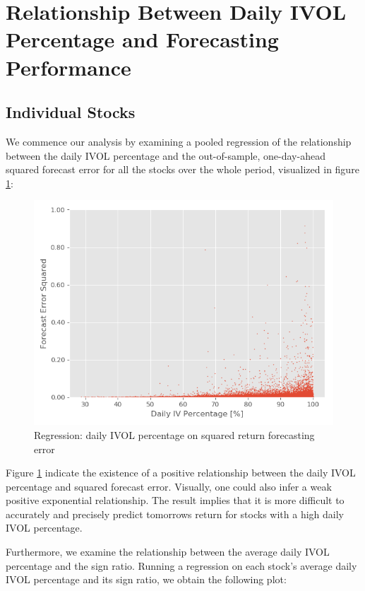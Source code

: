 \section{Relationship Between Daily IVOL Percentage and Forecasting Performance}

\subsection{Individual Stocks}

We commence our analysis by examining a pooled regression of the relationship between the daily IVOL percentage and the out-of-sample, one-day-ahead squared forecast error for all the stocks over the whole period, visualized in figure \ref{Scatter regression}: 

\begin{figure}[h]
    \centering
    \includegraphics[scale = 0.5]{Plot/ScatterRegression.png}
    \caption{Regression: daily IVOL percentage on squared return forecasting error}
    \label{Scatter regression}
\end{figure}

Figure \ref{Scatter regression} indicate the existence of a positive relationship between the daily IVOL percentage and squared forecast error. Visually, one could also infer a weak positive exponential relationship. The result implies that it is more difficult to accurately and precisely predict tomorrows return for stocks with a high daily IVOL percentage.

Furthermore, we examine the relationship between the average daily IVOL percentage and the sign ratio. Running a regression on each stock's average daily IVOL percentage and its sign ratio, we obtain the following plot: 

